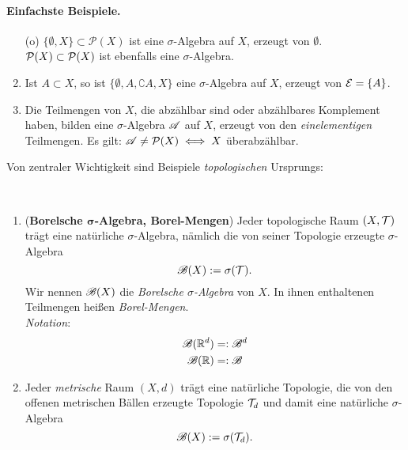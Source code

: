 \paragraph{Einfachste Beispiele.} 
\begin{enumerate}[(\roman*),topsep=5pt, itemsep = 0 pt]
	\item[(o)]  $\{\emptyset, X\} \subset \mathcal{P}(X)$ ist eine $\sigma$-Algebra auf $X$, erzeugt von $\emptyset$.\\
	$\PP (X) \subset \PP (X)$ ist ebenfalls eine $\sigma$-Algebra.
	\item Ist $A \subset X$, so ist $\{\emptyset, A, \complement A, X\}$ eine $\sigma$-Algebra auf $X$, erzeugt von $\EE=\{A\}$.
	\item Die Teilmengen von $X$, die abzählbar sind oder abzählbares Komplement haben, bilden eine $\sigma$-Algebra $\AA$ auf $X$, erzeugt von den \emph{einelementigen} Teilmengen. Es gilt: $\AA \neq \PP (X) \iff X $ überabzählbar. 
\end{enumerate}
Von zentraler Wichtigkeit sind Beispiele \emph{topologischen} Ursprungs:

\begin{example} \ 
\begin{enumerate}[(\roman*),topsep=5pt, itemsep = 0 pt]
	\item (\textbf{Borelsche $\boldsymbol\sigma$-Algebra, Borel-Mengen}) Jeder topologische Raum $(X,\TT)$ trägt eine natürliche $\sigma$-Algebra, nämlich die von seiner Topologie erzeugte $\sigma$-Algebra
	$$\BB(X):=\sigma(\TT).$$
	Wir nennen $\BB(X)$ die \emph{Borelsche $\sigma$-Algebra} von $X$. In ihnen enthaltenen Teilmengen heißen \emph{Borel-Mengen}. \\
	\textit{Notation}: 
	\begin{equation*}
		\begin{split}
			\BB(\R^d) & =: \BB^d \\
			\BB(\R) & =: \BB
		\end{split}
	\end{equation*}
	\item Jeder \emph{metrische} Raum $(X,d)$ trägt eine natürliche Topologie, die von den offenen metrischen Bällen erzeugte Topologie $\TT_d$ und damit eine natürliche $\sigma$-Algebra
	$$\BB(X):=\sigma(\TT_d).$$
\end{enumerate}
\end{example}

